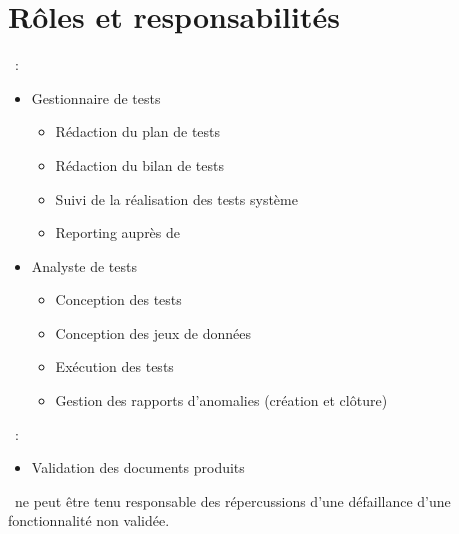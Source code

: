 
\section{Rôles et responsabilités}
\label{sec:resp}

\equipe~:
\begin{itemize}
    \item Gestionnaire de tests
    \begin{itemize}
        \item Rédaction du plan de tests
        \item Rédaction du bilan de tests
        \item Suivi de la réalisation des tests système
        \item Reporting auprès de \client
    \end{itemize}
    \item Analyste de tests
    \begin{itemize}
        \item Conception des tests
        \item Conception des jeux de données
        \item Exécution des tests
        \item Gestion des rapports d’anomalies (création et clôture)\\
    \end{itemize}
\end{itemize}

\client~:
\begin{itemize}
\item Validation des documents produits\\
\end{itemize}

\equipe~ne peut être tenu responsable des répercussions d'une défaillance d'une fonctionnalité non validée. 
